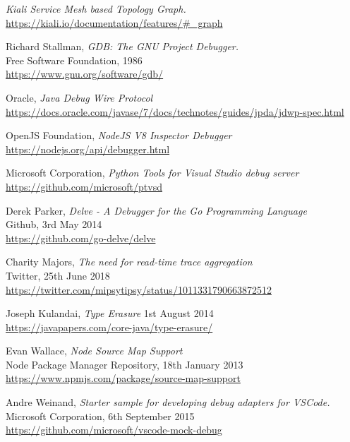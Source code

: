 \documentclass[12pt,pdftex,titlepage]{report}
\begin{document}
\begin{thebibliography}{69}
        \textit{Kiali Service Mesh based Topology Graph.} \\
        \url{https://kiali.io/documentation/features/#_graph}

        Richard Stallman, \textit{GDB: The GNU Project Debugger.} \\
        Free Software Foundation, 1986 \\
        \url{https://www.gnu.org/software/gdb/}

        Oracle, \textit{Java Debug Wire Protocol} \\
        \url{https://docs.oracle.com/javase/7/docs/technotes/guides/jpda/jdwp-spec.html}

        OpenJS Foundation, \textit{NodeJS V8 Inspector Debugger} \\
        \url{https://nodejs.org/api/debugger.html}

        Microsoft Corporation, \textit{Python Tools for Visual Studio debug server} \\
        \url{https://github.com/microsoft/ptvsd}

        Derek Parker, \textit{Delve - A Debugger for the Go Programming Language} \\
        Github, 3rd May 2014 \\
        \url{https://github.com/go-delve/delve}

        Charity Majors, \textit{The need for read-time trace aggregation} \\
        Twitter, 25th June 2018 \\
        \url{https://twitter.com/mipsytipsy/status/1011331790663872512}

        Joseph Kulandai, \textit{Type Erasure}
        1st August 2014 \\
        \url{https://javapapers.com/core-java/type-erasure/}

        Evan Wallace, \textit{Node Source Map Support} \\
        Node Package Manager Repository, 18th January 2013 \\ 
        \url{https://www.npmjs.com/package/source-map-support}

        Andre Weinand, \textit{Starter sample for developing debug adapters for VSCode.} \\
        Microsoft Corporation, 6th September 2015 \\
        \url{https://github.com/microsoft/vscode-mock-debug}


\end{thebibliography}
\end{document}

